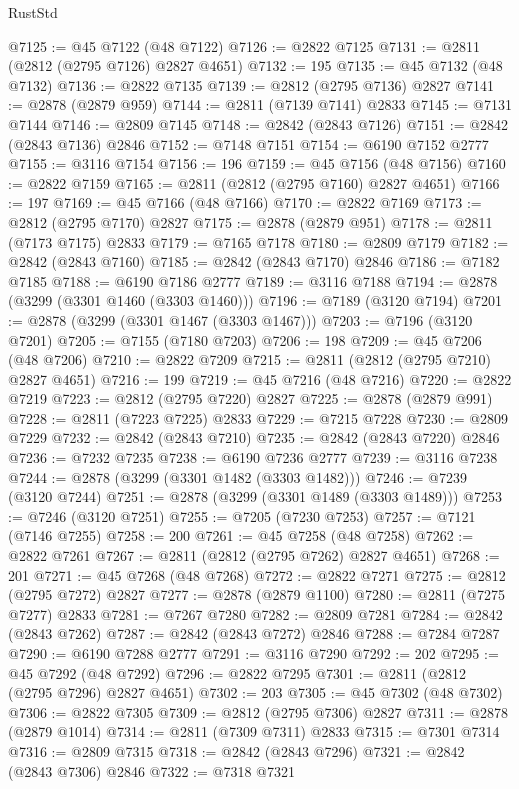 \begin{lexlean}{RustStd}
\begin{coremodule}
{\begin{coremodule}
{{{{{{{{{{{{{{{{{{{{{{{{{{{{{{{{{@7125 := @45 @7122 (@48 @7122)
@7126 := @2822 @7125
@7131 := @2811 (@2812 (@2795 @7126) @2827 @4651)
@7132 := 195
@7135 := @45 @7132 (@48 @7132)
@7136 := @2822 @7135
@7139 := @2812 (@2795 @7136) @2827
@7141 := @2878 (@2879 @959)
@7144 := @2811 (@7139 @7141) @2833
@7145 := @7131 @7144
@7146 := @2809 @7145
@7148 := @2842 (@2843 @7126)
@7151 := @2842 (@2843 @7136) @2846
@7152 := @7148 @7151
@7154 := @6190 @7152 @2777
@7155 := @3116 @7154
@7156 := 196
@7159 := @45 @7156 (@48 @7156)
@7160 := @2822 @7159
@7165 := @2811 (@2812 (@2795 @7160) @2827 @4651)
@7166 := 197
@7169 := @45 @7166 (@48 @7166)
@7170 := @2822 @7169
@7173 := @2812 (@2795 @7170) @2827
@7175 := @2878 (@2879 @951)
@7178 := @2811 (@7173 @7175) @2833
@7179 := @7165 @7178
@7180 := @2809 @7179
@7182 := @2842 (@2843 @7160)
@7185 := @2842 (@2843 @7170) @2846
@7186 := @7182 @7185
@7188 := @6190 @7186 @2777
@7189 := @3116 @7188
@7194 := @2878 (@3299 (@3301 @1460 (@3303 @1460)))
@7196 := @7189 (@3120 @7194)
@7201 := @2878 (@3299 (@3301 @1467 (@3303 @1467)))
@7203 := @7196 (@3120 @7201)
@7205 := @7155 (@7180 @7203)
@7206 := 198
@7209 := @45 @7206 (@48 @7206)
@7210 := @2822 @7209
@7215 := @2811 (@2812 (@2795 @7210) @2827 @4651)
@7216 := 199
@7219 := @45 @7216 (@48 @7216)
@7220 := @2822 @7219
@7223 := @2812 (@2795 @7220) @2827
@7225 := @2878 (@2879 @991)
@7228 := @2811 (@7223 @7225) @2833
@7229 := @7215 @7228
@7230 := @2809 @7229
@7232 := @2842 (@2843 @7210)
@7235 := @2842 (@2843 @7220) @2846
@7236 := @7232 @7235
@7238 := @6190 @7236 @2777
@7239 := @3116 @7238
@7244 := @2878 (@3299 (@3301 @1482 (@3303 @1482)))
@7246 := @7239 (@3120 @7244)
@7251 := @2878 (@3299 (@3301 @1489 (@3303 @1489)))
@7253 := @7246 (@3120 @7251)
@7255 := @7205 (@7230 @7253)
@7257 := @7121 (@7146 @7255)
@7258 := 200
@7261 := @45 @7258 (@48 @7258)
@7262 := @2822 @7261
@7267 := @2811 (@2812 (@2795 @7262) @2827 @4651)
@7268 := 201
@7271 := @45 @7268 (@48 @7268)
@7272 := @2822 @7271
@7275 := @2812 (@2795 @7272) @2827
@7277 := @2878 (@2879 @1100)
@7280 := @2811 (@7275 @7277) @2833
@7281 := @7267 @7280
@7282 := @2809 @7281
@7284 := @2842 (@2843 @7262)
@7287 := @2842 (@2843 @7272) @2846
@7288 := @7284 @7287
@7290 := @6190 @7288 @2777
@7291 := @3116 @7290
@7292 := 202
@7295 := @45 @7292 (@48 @7292)
@7296 := @2822 @7295
@7301 := @2811 (@2812 (@2795 @7296) @2827 @4651)
@7302 := 203
@7305 := @45 @7302 (@48 @7302)
@7306 := @2822 @7305
@7309 := @2812 (@2795 @7306) @2827
@7311 := @2878 (@2879 @1014)
@7314 := @2811 (@7309 @7311) @2833
@7315 := @7301 @7314
@7316 := @2809 @7315
@7318 := @2842 (@2843 @7296)
@7321 := @2842 (@2843 @7306) @2846
@7322 := @7318 @7321
}}}}}}}}}}}}}}}}}}}}}}}}}}}}}}}}}
\end{coremodule}}
\end{coremodule}
\end{lexlean}
